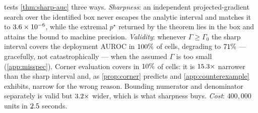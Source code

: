 \begin{table}[t]
\centering\small
\caption{\textbf{Sharpness and validity of the AUROC interval} (SL-Bench,
$\nExpOneNCells$ cells of $(\Gamma_0,\Gamma)$ over $\Gamma_0\in\{1.5,2,3,5\}$,
$\Gamma\in\{1,\dots,8\}$, $\nExpOneSeeds$ seeds). Coverage is of the true
\emph{deployment} AUROC on held-out units. Corner evaluation is narrow because
it is wrong.}
\label{tab:sharpness}
\end{table}

 tests \cref{thm:sharp-auc} three ways. \emph{Sharpness}:
an independent projected-gradient search over the identified box never escapes
the analytic interval and matches it to $3.6\times10^{-6}$, while the extremal
$p^\star$ returned by the theorem lies in the box and attains the bound to
machine precision. \emph{Validity}: whenever $\Gamma\ge\Gamma_0$ the sharp
interval covers the deployment AUROC in $100\%$ of cells, degrading
to $71\%$ --- gracefully, not catastrophically --- when the
assumed $\Gamma$ is too small (\cref{app:misspec}). Corner evaluation covers in
$10\%$ of cells: it is $15.3\times$ narrower
than the sharp interval and, as \cref{prop:corner} predicts and
\cref{app:counterexample} exhibits, narrow for the wrong reason. Bounding
numerator and denominator separately is valid but
$3.2\times$ wider, which is what sharpness buys.
\emph{Cost}: $400{,}000$ units in $2.5$ seconds.

